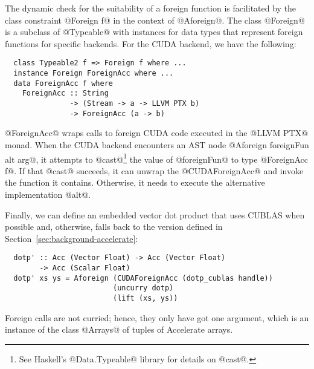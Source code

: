 The dynamic check for the suitability of a foreign function is facilitated by the class constraint @Foreign f@ in the context of @Aforeign@. The class @Foreign@ is a subclass of @Typeable@ with instances for data types that represent foreign functions for specific backends. For the CUDA backend, we have the following:
%
\begin{lstlisting}
  class Typeable2 f => Foreign f where ...
  instance Foreign ForeignAcc where ...
  data ForeignAcc f where
    ForeignAcc :: String
               -> (Stream -> a -> LLVM PTX b)
               -> ForeignAcc (a -> b)
\end{lstlisting}%
%
@ForeignAcc@ wraps calls to foreign CUDA code executed in the @LLVM PTX@ monad. When the CUDA backend encounters an AST node  @Aforeign foreignFun alt arg@, it attempts to @cast@\footnote{See Haskell's @Data.Typeable@ library for details on @cast@.} the value of @foreignFun@ to type @ForeignAcc f@. If that @cast@ succeeds, it can unwrap the @CUDAForeignAcc@ and invoke the function it contains. Otherwise, it needs to execute the alternative implementation @alt@.

Finally, we can define an embedded vector dot product that uses CUBLAS when possible and, otherwise, falls back to the version defined in Section~\ref{sec:background-accelerate}:
%
\begin{lstlisting}
  dotp' :: Acc (Vector Float) -> Acc (Vector Float)
        -> Acc (Scalar Float)
  dotp' xs ys = Aforeign (CUDAForeignAcc (dotp_cublas handle))
                         (uncurry dotp)
                         (lift (xs, ys))
\end{lstlisting}%
%
Foreign calls are not curried; hence, they only have got one argument, which is an instance of the class @Arrays@ of tuples of Accelerate arrays.



